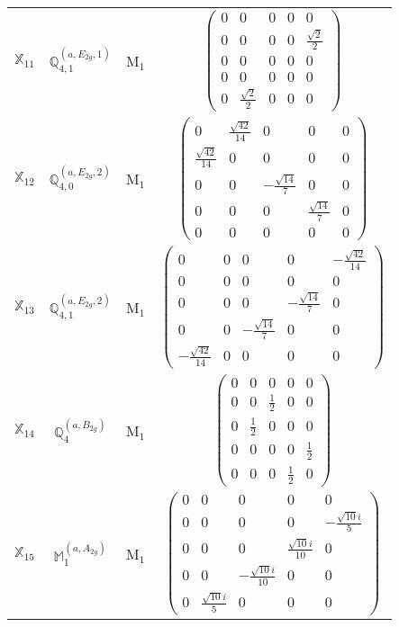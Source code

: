 \documentclass[fleqn,10pt,landscape]{article}
\begin{document}
\begin{itemize}
\begin{center}
\begin{longtable}{c|c|c|c}
$ \mathbb{X}_{11} $ & $\mathbb{Q}_{4,1}^{(a,E_{2g},1)}$ & M$_{1}$ & $\begin{pmatrix} 0 & 0 & 0 & 0 & 0 \\ 0 & 0 & 0 & 0 & \frac{\sqrt{2}}{2} \\ 0 & 0 & 0 & 0 & 0 \\ 0 & 0 & 0 & 0 & 0 \\ 0 & \frac{\sqrt{2}}{2} & 0 & 0 & 0 \end{pmatrix}$ \\
$ \mathbb{X}_{12} $ & $\mathbb{Q}_{4,0}^{(a,E_{2g},2)}$ & M$_{1}$ & $\begin{pmatrix} 0 & \frac{\sqrt{42}}{14} & 0 & 0 & 0 \\ \frac{\sqrt{42}}{14} & 0 & 0 & 0 & 0 \\ 0 & 0 & - \frac{\sqrt{14}}{7} & 0 & 0 \\ 0 & 0 & 0 & \frac{\sqrt{14}}{7} & 0 \\ 0 & 0 & 0 & 0 & 0 \end{pmatrix}$ \\
$ \mathbb{X}_{13} $ & $\mathbb{Q}_{4,1}^{(a,E_{2g},2)}$ & M$_{1}$ & $\begin{pmatrix} 0 & 0 & 0 & 0 & - \frac{\sqrt{42}}{14} \\ 0 & 0 & 0 & 0 & 0 \\ 0 & 0 & 0 & - \frac{\sqrt{14}}{7} & 0 \\ 0 & 0 & - \frac{\sqrt{14}}{7} & 0 & 0 \\ - \frac{\sqrt{42}}{14} & 0 & 0 & 0 & 0 \end{pmatrix}$ \\
$ \mathbb{X}_{14} $ & $\mathbb{Q}_{4}^{(a,B_{2g})}$ & M$_{1}$ & $\begin{pmatrix} 0 & 0 & 0 & 0 & 0 \\ 0 & 0 & \frac{1}{2} & 0 & 0 \\ 0 & \frac{1}{2} & 0 & 0 & 0 \\ 0 & 0 & 0 & 0 & \frac{1}{2} \\ 0 & 0 & 0 & \frac{1}{2} & 0 \end{pmatrix}$ \\
$ \mathbb{X}_{15} $ & $\mathbb{M}_{1}^{(a,A_{2g})}$ & M$_{1}$ & $\begin{pmatrix} 0 & 0 & 0 & 0 & 0 \\ 0 & 0 & 0 & 0 & - \frac{\sqrt{10} i}{5} \\ 0 & 0 & 0 & \frac{\sqrt{10} i}{10} & 0 \\ 0 & 0 & - \frac{\sqrt{10} i}{10} & 0 & 0 \\ 0 & \frac{\sqrt{10} i}{5} & 0 & 0 & 0 \end{pmatrix}$ \\

\end{longtable}
\end{center}
\end{itemize}
\end{document}
